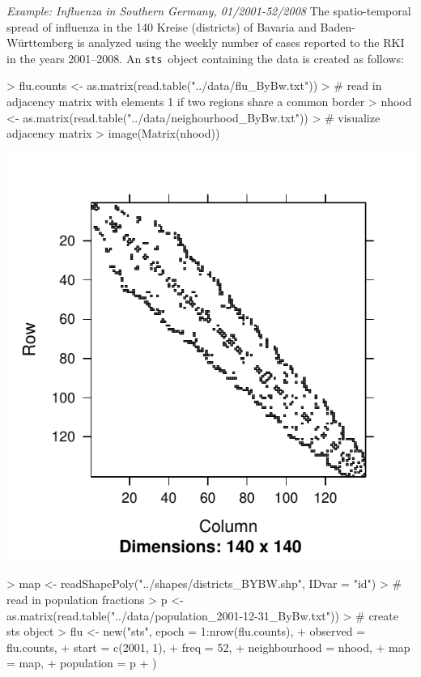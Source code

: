 \documentclass[a4paper,11pt]{article}
\newcommand{\sts}{\texttt{sts}}
\newcommand{\example}[1]{\textit{Example: #1}}
\begin{document}
\example{Influenza in Southern Germany, 01/2001-52/2008}
The spatio-temporal spread of influenza in the 140 Kreise (districts) 
of Bavaria and Baden-W\"urttemberg  is analyzed using the weekly number of 
cases reported to the RKI~\citep{survstat-fluByBw} in the years 2001--2008.
An \sts\ object containing the data is created as follows:
\begin{Schunk}
\begin{Sinput}
> flu.counts <- as.matrix(read.table("../data/flu_ByBw.txt"))
> # read in adjacency matrix with elements 1 if two regions share a common border
> nhood <- as.matrix(read.table("../data/neighourhood_ByBw.txt"))
> # visualize adjacency matrix
> image(Matrix(nhood))
\end{Sinput}
\end{Schunk}
\begin{center}
\vspace*{-2em}
\includegraphics{figs/vignette_hhh4-nhoodByBw}
\end{center}
\begin{Schunk}
\begin{Sinput}
> map <- readShapePoly("../shapes/districts_BYBW.shp", IDvar = "id")
> # read in population fractions
> p <- as.matrix(read.table("../data/population_2001-12-31_ByBw.txt"))
> # create sts object
> flu <- new("sts", epoch = 1:nrow(flu.counts),
+                   observed = flu.counts,
+                   start = c(2001, 1),
+                   freq = 52,
+                   neighbourhood = nhood,
+                   map = map,
+                   population = p
+                   )
\end{Sinput}
\end{Schunk}
\end{document}
